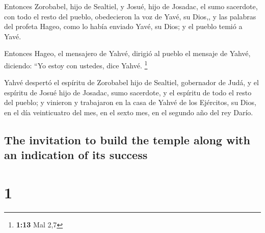 \begin{paracol}{2}
 Entonces Zorobabel, hijo de Sealtiel, y Josué, hijo de
Josadac, el sumo sacerdote, con todo el resto del pueblo, obedecieron la
voz de Yavé, su Dios,, y las palabras del profeta Hageo, como lo había
enviado Yavé, su Dios; y el pueblo temió a Yavé.

 Entonces Hageo, el mensajero de Yahvé, dirigió al pueblo
el mensaje de Yahvé, diciendo: ``Yo estoy con ustedes, dice Yahvé.
\footnote{\textbf{1:13} Mal 2,7}

 Yahvé despertó el espíritu de Zorobabel hijo de
Sealtiel, gobernador de Judá, y el espíritu de Josué hijo de Josadac,
sumo sacerdote, y el espíritu de todo el resto del pueblo; y vinieron y
trabajaron en la casa de Yahvé de los Ejércitos, su Dios,
 en el día veinticuatro del mes, en el sexto mes, en el
segundo año del rey Darío.

\switchcolumn
\begin{otherlanguage}{english}

\hypertarget{the-invitation-to-build-the-temple-along-with-an-indication-of-its-success}{%
\subsection{The invitation to build the temple along with an indication
of its
success}\label{the-invitation-to-build-the-temple-along-with-an-indication-of-its-success}}

\hypertarget{section-1}{%
\section{1}\label{section-1}}


\end{otherlanguage}
\end{paracol}
